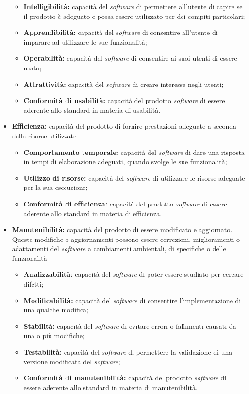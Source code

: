 \begin{itemize}
	\begin{itemize}
		\item \textbf{Intelligibilità:} capacità del \textit{software} di 
		permettere all'utente di capire se il prodotto è adeguato e possa 
		essere utilizzato per dei compiti particolari;
		\item \textbf{Apprendibilità:} capacità del \textit{software} di 
		consentire all'utente di imparare ad utilizzare le sue funzionalità;
		\item \textbf{Operabilità:} capacità del \textit{software} di 
		consentire ai suoi utenti di essere usato;
		\item \textbf{Attrattività:} capacità del \textit{software} di creare 
		interesse negli utenti;
		\item \textbf{Conformità di usabilità:} capacità del prodotto 
		\textit{software} di essere aderente allo standard in materia di 
		usabilità.
	\end{itemize}
	
	\item \textbf{Efficienza:} capacità del prodotto di fornire prestazioni adeguate a seconda delle risorse utilizzate
	\begin{itemize}
		\item \textbf{Comportamento temporale:} capacità del \textit{software} 
		di dare una risposta in tempi di elaborazione adeguati, quando svolge 
		le sue funzionalità;
		\item \textbf{Utilizzo di risorse:} capacità del \textit{software} di 
		utilizzare le risorse adeguate per la sua esecuzione;
		\item \textbf{Conformità di efficienza:} capacità del prodotto 
		\textit{software} di essere aderente allo standard in materia di 
		efficienza.
	\end{itemize}
	
	\item \textbf{Manutenibilità:} capacità del prodotto di essere modificato e 
	aggiornato. Queste modifiche o aggiornamenti possono essere correzioni, 
	miglioramenti o adattamenti del \textit{software} a cambiamenti ambientali, 
	di specifiche o delle funzionalità
	\begin{itemize}
		\item \textbf{Analizzabilità:} capacità del \textit{software} di poter 
		essere studiato per cercare difetti;
		\item \textbf{Modificabilità:} capacità del \textit{software} di 
		consentire l'implementazione di una qualche modifica;
		\item \textbf{Stabilità:} capacità del \textit{software} di evitare 
		errori o fallimenti causati da una o più modifiche;
		\item \textbf{Testabilità:} capacità del \textit{software} di 
		permettere la validazione di una versione modificata del 
		\textit{software};
		\item \textbf{Conformità di manutenibilità:} capacità del prodotto 
		\textit{software} di essere aderente allo standard in materia di 
		manutenibilità.
	\end{itemize}
	

\end{itemize}
